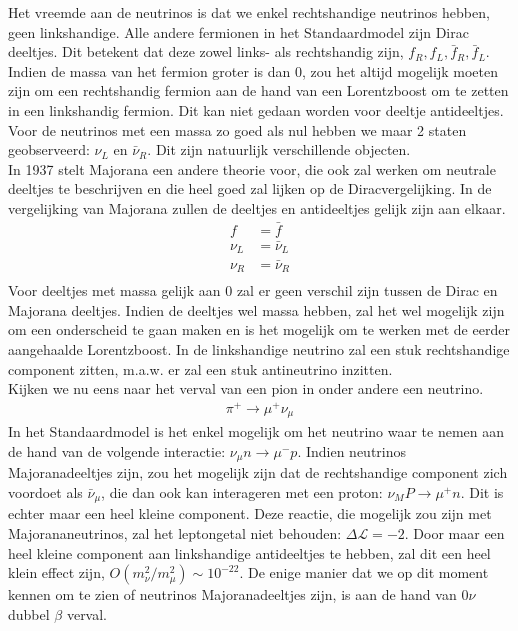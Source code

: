 \documentclass[../main.tex]{subfiles}
\begin{document}
Het vreemde aan de neutrinos is dat we enkel rechtshandige neutrinos hebben, geen linkshandige. Alle andere fermionen in het Standaardmodel zijn Dirac deeltjes. Dit betekent dat deze zowel links- als rechtshandig zijn, $f_{R}, f_{L}, \bar{f}_{R}, \bar{f}_{L}$. Indien de massa van het fermion groter is dan 0, zou het altijd mogelijk moeten zijn om een rechtshandig fermion aan de hand van een Lorentzboost om te zetten in een linkshandig fermion. Dit kan niet gedaan worden voor deeltje antideeltjes. Voor de neutrinos met een massa zo goed als nul hebben we maar 2 staten geobserveerd: $\nu_L$ en $\bar{\nu}_R$. Dit zijn natuurlijk verschillende objecten.\\
In 1937 stelt Majorana een andere theorie voor, die ook zal werken om neutrale deeltjes te beschrijven en die heel goed zal lijken op de Diracvergelijking. In de vergelijking van Majorana zullen de deeltjes en antideeltjes gelijk zijn aan elkaar.
\begin{equation}
    \begin{aligned}
        \label{eq:majorana_deeltjes}
        f &= \bar{f}\\
        \nu_L &= \bar{\nu}_L\\
        \nu_R &= \bar{\nu}_R\\
    \end{aligned}
\end{equation}
Voor deeltjes met massa gelijk aan 0 zal er geen verschil zijn tussen de Dirac en Majorana deeltjes. Indien de deeltjes wel massa hebben, zal het wel mogelijk zijn om een onderscheid te gaan maken en is het mogelijk om te werken met de eerder aangehaalde Lorentzboost. In de linkshandige neutrino zal een stuk rechtshandige component zitten, m.a.w. er zal een stuk antineutrino inzitten.\\
Kijken we nu eens naar het verval van een pion in onder andere een neutrino.
\begin{equation}
    \begin{aligned}
        \label{eq:pion_neutrino_verval}
        \pi^{+} \rightarrow \mu^{+} \nu_{\mu}
    \end{aligned}
\end{equation}
In het Standaardmodel is het enkel mogelijk om het neutrino waar te nemen aan de hand van de volgende interactie: $\nu_{\mu} n \rightarrow \mu^{-} p$. Indien neutrinos Majoranadeeltjes zijn, zou het mogelijk zijn dat de rechtshandige component zich voordoet als $\bar{\nu}_\mu$, die dan ook kan interageren met een proton: $\nu_M P \longrightarrow \mu^{+} n$. Dit is echter maar een heel kleine component. Deze reactie, die mogelijk zou zijn met Majorananeutrinos, zal het leptongetal niet behouden: $\Delta \mathcal{L}=-2$. Door maar een heel kleine component aan linkshandige antideeltjes te hebben, zal dit een heel klein effect zijn, $O\left(m_{\nu}^{2} / m_{\mu}^{2}\right) \sim 10^{-22}$. De enige manier dat we op dit moment kennen om te zien of neutrinos Majoranadeeltjes zijn, is aan de hand van $0\nu$ dubbel $\beta$ verval.
\end{document}
